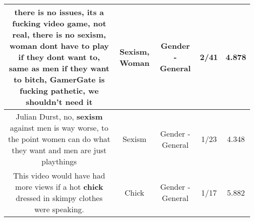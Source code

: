\documentclass[11pt]{article}
\newlength\mylength
\begin{document}
\begin{center}
\begin{longtable}{|C{.65\mylength}|C{.30\mylength}|C{.12\mylength}|C{.12\mylength}|C{.12\mylength}|}
  \small there is no issues, its a fucking video game, not real, there is no \textbf{sexism}, \textbf{woman} dont have to play if they dont want to, same as men if they want to bitch, GamerGate is fucking pathetic, we shouldn't need it\normalsize   & Sexism, Woman & Gender - General & 2/41 & 4.878 \\  \hline
  \small Julian Durst, no, \textbf{sexism} against men is way worse, to the point women can do what they want and men are just playthings\normalsize   & Sexism & Gender - General & 1/23 & 4.348 \\  \hline
  \small This video would have had more views if a hot \textbf{chick} dressed in skimpy clothes were speaking.\normalsize   & Chick & Gender - General & 1/17 & 5.882 \\  \hline

\end{longtable}
\end{center}
\end{document}
